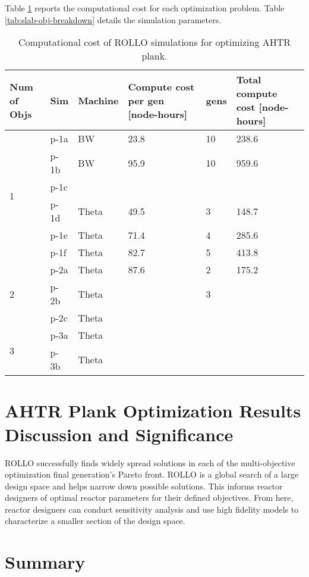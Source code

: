 Table \ref{tab:plank-compute-cost} reports the computational cost for each optimization 
problem. 
Table \ref{tab:slab-obj-breakdown} details the simulation parameters. 
\begin{table}[htbp!]
    \centering
    \onehalfspacing
    \caption{Computational cost of \acrfull{ROLLO} simulations for optimizing \acrfull{AHTR}
    plank.}
	\label{tab:plank-compute-cost}
    \footnotesize
    \begin{tabular}{p{1.4cm}|p{1cm}lp{4cm}lp{4cm}}
    \hline 
    \textbf{Num of Objs} & \textbf{Sim} & \textbf{Machine} & \textbf{Compute cost per gen [node-hours]} &\textbf{gens} & \textbf{Total compute cost [node-hours]} \\
    \hline
    \multirow{6}{2cm}{1} 
    & p-1a & BW & 23.8 & 10 & 238.6\\
    & p-1b & BW & 95.9 & 10 & 959.6\\
    & p-1c & & & & \\
    & p-1d & Theta & 49.5 & 3 & 148.7\\
    & p-1e & Theta & 71.4 & 4 & 285.6\\
    & p-1f & Theta & 82.7 & 5 & 413.8 \\
    \hline
    \multirow{3}{2cm}{2}
    & p-2a & Theta & 87.6 & 2 & 175.2\\
    & p-2b & Theta & & 3 & \\
    & p-2c & Theta & & & \\
    \hline
    \multirow{2}{2cm}{3}
    & p-3a & Theta & & & \\
    & p-3b & Theta & & & \\
    \hline
    \end{tabular}
\end{table}

\section{AHTR Plank Optimization Results Discussion and Significance}
\label{sec:plank-discussion}
\gls{ROLLO} successfully finds widely spread solutions in each of the multi-objective 
optimization final generation's Pareto front.
\gls{ROLLO} is a global search of a large design space and helps narrow down possible 
solutions.
This informs reactor designers of optimal reactor parameters for their defined objectives.  
From here, reactor designers can conduct sensitivity analysis and use high fidelity 
models to characterize a smaller section of the design space.

\section{Summary}
